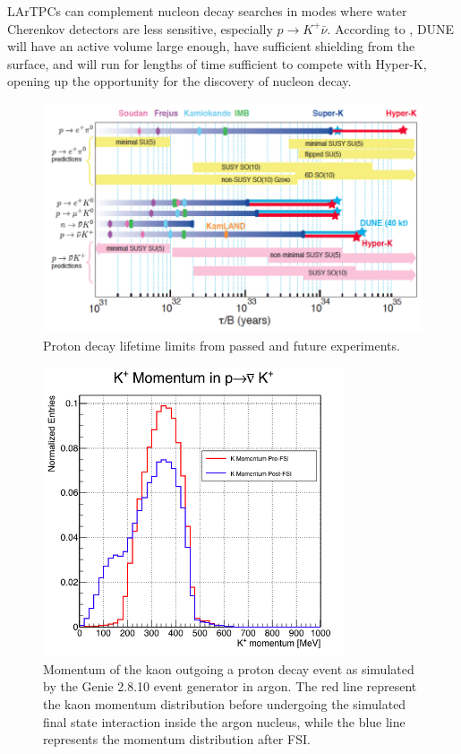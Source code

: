 LArTPCs can complement nucleon decay searches in modes where water Cherenkov detectors are less sensitive, especially $p\rightarrow K^+\bar{\nu}$. According to \cite{Acciarri:Dune}, DUNE will have an active volume large enough, have sufficient shielding from the surface, and will run for lengths of time sufficient to compete with Hyper-K, opening up the opportunity for the discovery of nucleon decay. 

\begin{figure}[hbpt]
\centering
\includegraphics[width=\textwidth]{Chapter-2/Images/PDKExperimentalLImit.png}
\caption{Proton decay lifetime limits from passed and future experiments.}
\label{fig:PDKExperimentalLImit}
\end{figure}


\begin{figure}[hbpt]
\centering
\includegraphics[width=3.5in]{Chapter-2/Images/pdkGenie.png}
\caption{Momentum of the kaon outgoing a proton decay event as simulated by the Genie 2.8.10 event generator in argon. The red line represent the kaon momentum distribution before undergoing the simulated final state interaction inside the argon nucleus, while the blue line represents the momentum distribution after FSI. }
\label{fig:PDKGENIE}
\end{figure}


